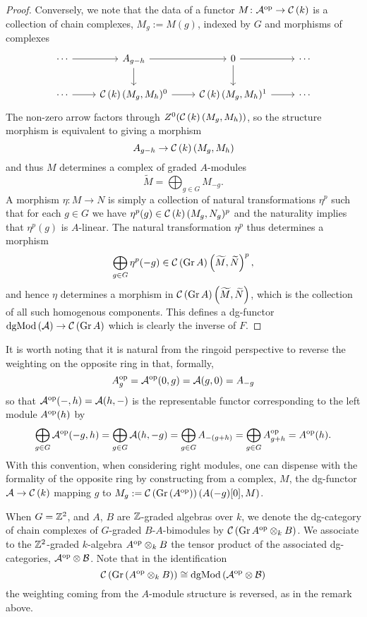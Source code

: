 \documentclass[dissertation.tex]{subfiles}
\begin{document}
\begin{lemma}
\begin{proof}
    Conversely, we note that the data of a functor \(M \colon \mathcal{A}^{\operatorname{op}} \to \mathcal{C}\left(k\right)\) is a collection of chain complexes, \(M_g := M(g)\), indexed by \(G\) and morphisms of complexes
    \[\begin{tikzcd}
    \cdots \arrow{r} & A_{g - h} \arrow{r}\arrow{d} & 0 \arrow{r}\arrow{d} & \cdots\\
    \cdots \arrow{r} & \CH{k}(M_g,M_h)^0 \arrow{r} & \CH{k}(M_g, M_h)^1 \arrow{r} & \cdots
    \end{tikzcd}\]    The non-zero arrow factors through \(Z^0(\mathcal{C}\left(k\right)(M_g, M_h))\), so the structure morphism is equivalent to giving a morphism
    \[A_{g - h} \to \mathcal{C}\left(k\right)(M_g,M_h)\]
    and thus \(M\) determines a complex of graded \(A\)-modules
    \[\widetilde{M} = \bigoplus_{g \in G}M_{-g}.\]
    A morphism \(\eta \colon M \to N\) is simply a collection of natural transformations \(\eta^p\) such that for each \(g \in G\) we have \(\eta^p(g) \in \mathcal{C}\left(k\right)(M_g,N_g)^p\) and the naturality implies that \(\eta^p(g)\) is \(A\)-linear.
    The natural transformation \(\eta^p\) thus determines a morphism
    \[\bigoplus_{g \in G} \eta^p(-g) \in \mathcal{C}\left(\operatorname{Gr}A\right)\left(\widetilde{M}, \widetilde{N}\right)^p,\]
    and hence \(\eta\) determines a morphism in \(\mathcal{C}\left(\operatorname{Gr}A\right)\left(\widetilde{M}, \widetilde{N}\right)\), which is the collection of all such homogenous components.
    This defines a dg-functor \(\operatorname{dgMod}\left(\mathcal{A}\right) \to \mathcal{C}\left(\operatorname{Gr}A\right)\) which is clearly the inverse of \(F\).
  \end{proof}
\end{lemma}

\begin{remark}
  It is worth noting that it is natural from the ringoid perspective to reverse the weighting on the opposite ring in that, formally,
  \[A^{\operatorname{op}}_{g} = \mathcal{A}^{\operatorname{op}}(0,g) = \mathcal{A}(g,0) = A_{-g}\]
  so that \(\mathcal{A}^{\operatorname{op}}(-, h) = \mathcal{A}(h,-)\) is the representable functor corresponding to the left module \(A^{\operatorname{op}}(h)\) by
  \[\bigoplus_{g \in G} \mathcal{A}^{\operatorname{op}}(-g,h) = \bigoplus_{g \in G} \mathcal{A}(h,-g) = \bigoplus_{g \in G} A_{-(g + h)} = \bigoplus_{g \in G} A^{\operatorname{op}}_{g + h} = A^{\operatorname{op}}(h).\]
  With this convention, when considering right modules, one can dispense with the formality of the opposite ring by constructing from a complex, \(M\), the dg-functor \(\mathcal{A} \to \mathcal{C}\left(k\right)\) mapping \(g\) to \(M_g := \mathcal{C}\left(\operatorname{Gr}\left(A^{{\operatorname{op}}}\right)\right)(A(-g)[0], M)\).
\end{remark}
When \(G = \mathbb{Z}^2\), and \(A\), \(B\) are \(\mathbb{Z}\)-graded algebras over \(k\), we denote the dg-category of chain complexes of \(G\)-graded \(B\)-\(A\)-bimodules by \(\mathcal{C}\left(\operatorname{Gr}A^{\operatorname{op}} \otimes_k B\right)\).
We associate to the \(\mathbb{Z}^2\)-graded \(k\)-algebra \(A^{\operatorname{op}} \otimes_k B\) the tensor product of the associated dg-categories, \(\mathcal{A}^{\operatorname{op}} \otimes \mathcal{B}\).
Note that in the identification
\[\mathcal{C}\left(\operatorname{Gr}\left(A^{\operatorname{op}} \otimes_k B\right)\right) \cong \operatorname{dgMod}\left(\mathcal{A}^{\operatorname{op}} \otimes \mathcal{B}\right)\]
the weighting coming from the \(A\)-module structure is reversed, as in the remark above.
\end{document}

